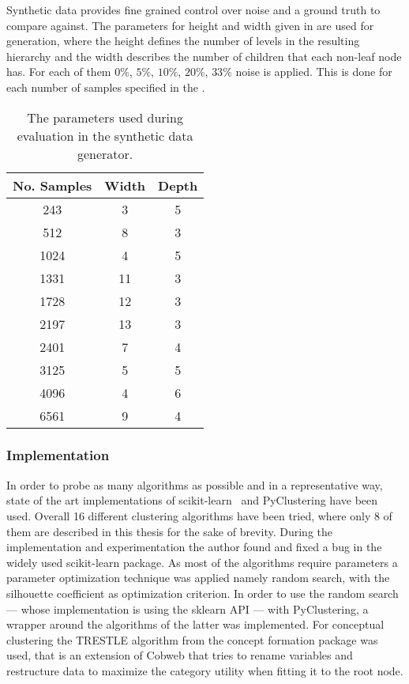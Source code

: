 \noindent Synthetic data provides fine grained control over noise and a ground truth to compare against. The parameters for height and width given in  are used for generation, where the height defines the number of levels in the resulting hierarchy and the width describes the number of children that each non-leaf node has. For each of them $0\%$, $5\%$, $10\%$, $20\%$, $33\%$ noise is applied. This is done for each number of samples specified in the .
\begin{table}[htp]
     \centering
     \begin{tabular}{|c|c|c|} \hline
            No. Samples & Width & Depth \\ \hline \hline
            243 & 3 & 5 \\ \hline
            512 & 8 & 3 \\ \hline
            1024 & 4 & 5 \\ \hline
            1331 & 11 & 3 \\ \hline
            1728 & 12 & 3 \\\hline
            2197 & 13 & 3 \\ \hline
            2401 & 7 & 4 \\ \hline
            3125 & 5 & 5 \\ \hline
            4096 & 4 & 6 \\ \hline
            6561 & 9 & 4 \\ \hline
        \end{tabular}
    \caption{The parameters used during evaluation in the synthetic data generator.}
    \label{tab:synthetic_params}
\end{table}{}

\subsubsection{Implementation}
In order to probe as many algorithms as possible and in a representative way, state of the art implementations of scikit-learn~\cite{scikit-learn} and PyClustering have been used. Overall 16 different clustering algorithms have been tried, where only 8 of them are described in this thesis for the sake of brevity. During the implementation and experimentation the author found and fixed a bug in the widely used scikit-learn package. As most of the algorithms require parameters a parameter optimization technique was applied namely random search, with the silhouette coefficient as optimization criterion. In order to use the random search --- whose implementation is using the sklearn API --- with PyClustering, a wrapper around the algorithms of the latter was implemented. For conceptual clustering the TRESTLE algorithm from the concept formation package was used, that is an extension of Cobweb that tries to rename variables and restructure data to maximize the category utility when fitting it to the root node. \\

